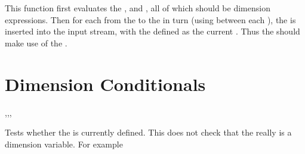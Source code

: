 \documentclass[oneside]{book}
\begin{document}
\begin{function}{\dimStepVariable}
\begin{syntax}
     
\end{syntax}
This function first evaluates the , 
and , all of which should be dimension expressions.
Then for each  from the  to the
 in turn (using  between each
), the  is inserted into the input stream,
with the  defined as the current .  Thus
the  should make use of the .
\end{function}

\section{Dimension Conditionals}

\begin{function}{\dimIfExist,\dimIfExistT,\dimIfExistF,\dimIfExistTF}
\begin{syntax}
 
  
  
   
\end{syntax}
Tests whether the  is currently defined.  This does
not check that the  really is a dimension variable.
For example
\begin{demohigh}
\dimIfExistTF {} {}
\dimIfExistTF {} {}
\end{demohigh}
\end{function}
\end{document}
